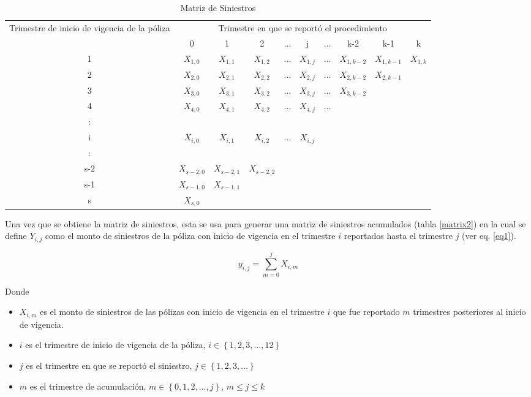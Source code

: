 \documentclass[11pt,twoside,openright,spanish]{report}
\numberwithin{equation}{chapter}
\numberwithin{figure}{chapter}
\numberwithin{table}{chapter}
\begin{document}
	\begin{table}[ht]
	\centering
	\begin{tabularx}{\linewidth}{c|ccccccccc}
		\multirow{2}{4cm}{Trimestre de inicio de vigencia de la póliza} & \multicolumn{9}{c}{Trimestre en que se reportó el procedimiento} \\
			& 0  & 1 & 2 & $ \dots $ & j & $\dots $ & k-2 & k-1 &  k \\
		\midrule
		1      &  $X_{1,0}^{}$ & $X_{1,1}^{}$ & $X_{1,2}^{}$ & $ \dots $ & $X_{1,j}^{}$ & $ \dots $ & $X_{1,k-2}^{}$ & $X_{1,k-1}^{}$ & $X_{1,k}^{}$ \\
		2      &  $X_{2,0}^{}$ & $X_{2,1}^{}$ & $X_{2,2}^{}$ & $ \dots $ & $X_{2,j}^{}$ & $ \dots $ & $X_{2,k-2}^{}$ & $X_{2,k-1}^{}$ & \\
		3      &  $X_{3,0}^{}$ & $X_{3,1}^{}$ & $X_{3,2}^{}$ & $ \dots $ & $X_{3,j}^{}$ & $ \dots $ & $X_{3,k-2}^{}$ & & \\
		4      &  $X_{4,0}^{}$ & $X_{4,1}^{}$ & $X_{4,2}^{}$ & $ \dots $ & $X_{4,j}^{}$ & $ \dots $ & & & \\
		:      & & & & & & & & &\\
		i      &  $X_{i,0}^{}$ & $X_{i,1}^{}$ & $X_{i,2}^{}$ & $ \dots $ & $X_{i,j}^{}$ & & & & \\
		:      & & & & & & & & & \\
		s-2      &  $X_{s-2,0}^{}$ & $X_{s-2,1}^{}$ & $X_{s-2,2}^{}$ & & & & & & \\
		s-1      &  $X_{s-1,0}^{}$ & $X_{s-1,1}^{}$ & & & & & & & \\
		s      &  $X_{s,0}^{}$ & & & & & & & & \\
	\end{tabularx}
\caption{Matriz de Siniestros}
\label{matrix1}
	\end{table}

	\vspace{1cm}

	Una vez que se obtiene la matriz de siniestros, esta se usa para generar una matriz de siniestros acumulados (tabla \ref{matrix2}) en la cual se define ${Y}_{i,j}$ como el monto de siniestros de la póliza con inicio de vigencia en el trimestre $i$ reportados hasta el trimestre $j$ (ver eq. \ref{eq1}).
	
	\begin{equation}
	{y}_{i,j}=\sum _{m=0}^{j}{X}_{i,m}
		\label{eq1}
	\end{equation}

	Donde
	
	\begin{itemize}
	\setlength\itemsep{-0.5em}
		\item ${X}_{i,m}$ es el monto de siniestros de las pólizas con inicio de vigencia en el trimestre $i$ que fue reportado $m$ trimestres posteriores al inicio de vigencia.
		\item $i$ es el trimestre de inicio de vigencia de la póliza, $i\in \left\{1,2,3,\dots ,12\right\}$
		\item $j$ es el trimestre en que se reportó el siniestro,  $j\in \left\{1,2,3,\dots\right\}$
		\item $m$ es el trimestre de acumulación, $m\in \left\{0,1,2,\dots ,j\right\}$, $m\le j\le k$
	\end{itemize} 
	
\end{document}
